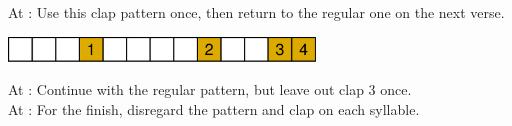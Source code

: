 {\small
	At : Use this clap pattern once, then return to the regular one on the next verse.\\
	\centerline{\includegraphics[height=0.66cm,keepaspectratio]{images/mylist_clappattern_special.pdf}}
	At : Continue with the regular pattern, but leave out clap 3 once.\\
	At : For the finish, disregard the pattern and clap on each syllable.
}

\ifdefined\COMPLETE
\else
	
\fi
